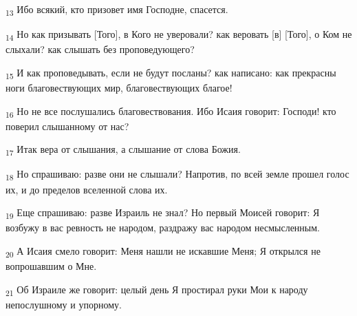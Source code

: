 \begin{tcolorbox}
\textsubscript{13} Ибо всякий, кто призовет имя Господне, спасется.
\end{tcolorbox}
\begin{tcolorbox}
\textsubscript{14} Но как призывать [Того], в Кого не уверовали? как веровать [в] [Того], о Ком не слыхали? как слышать без проповедующего?
\end{tcolorbox}
\begin{tcolorbox}
\textsubscript{15} И как проповедывать, если не будут посланы? как написано: как прекрасны ноги благовествующих мир, благовествующих благое!
\end{tcolorbox}
\begin{tcolorbox}
\textsubscript{16} Но не все послушались благовествования. Ибо Исаия говорит: Господи! кто поверил слышанному от нас?
\end{tcolorbox}
\begin{tcolorbox}
\textsubscript{17} Итак вера от слышания, а слышание от слова Божия.
\end{tcolorbox}
\begin{tcolorbox}
\textsubscript{18} Но спрашиваю: разве они не слышали? Напротив, по всей земле прошел голос их, и до пределов вселенной слова их.
\end{tcolorbox}
\begin{tcolorbox}
\textsubscript{19} Еще спрашиваю: разве Израиль не знал? Но первый Моисей говорит: Я возбужу в вас ревность не народом, раздражу вас народом несмысленным.
\end{tcolorbox}
\begin{tcolorbox}
\textsubscript{20} А Исаия смело говорит: Меня нашли не искавшие Меня; Я открылся не вопрошавшим о Мне.
\end{tcolorbox}
\begin{tcolorbox}
\textsubscript{21} Об Израиле же говорит: целый день Я простирал руки Мои к народу непослушному и упорному.
\end{tcolorbox}
